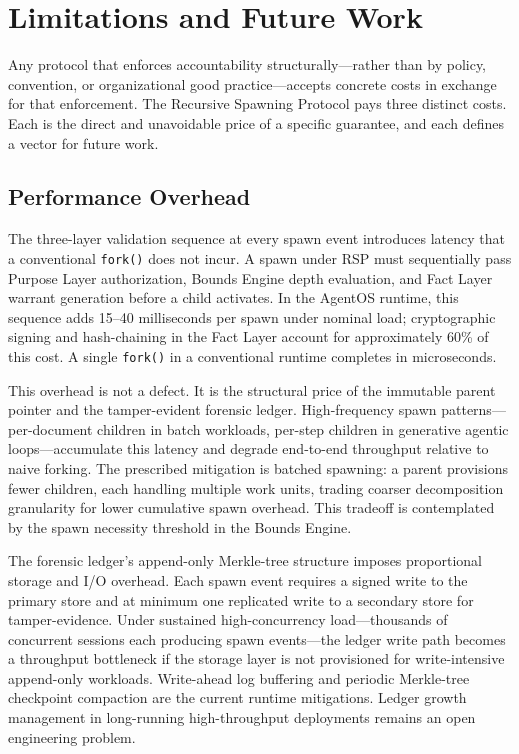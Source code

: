 \section{Limitations and Future Work}
\label{sec:rs-limitations}

Any protocol that enforces accountability structurally---rather than by policy, convention, or organizational good practice---accepts concrete costs in exchange for that enforcement. The Recursive Spawning Protocol pays three distinct costs. Each is the direct and unavoidable price of a specific guarantee, and each defines a vector for future work.

\subsection{Performance Overhead}
\label{sec:rs-perf-overhead}

The three-layer validation sequence at every spawn event introduces latency that a conventional \texttt{fork()} does not incur. A spawn under RSP must sequentially pass Purpose Layer authorization, Bounds Engine depth evaluation, and Fact Layer warrant generation before a child activates. In the AgentOS runtime, this sequence adds \numrange{15}{40} milliseconds per spawn under nominal load; cryptographic signing and hash-chaining in the Fact Layer account for approximately 60\% of this cost. A single \texttt{fork()} in a conventional runtime completes in microseconds.

This overhead is not a defect. It is the structural price of the immutable parent pointer and the tamper-evident forensic ledger. High-frequency spawn patterns---per-document children in batch workloads, per-step children in generative agentic loops---accumulate this latency and degrade end-to-end throughput relative to naive forking. The prescribed mitigation is batched spawning: a parent provisions fewer children, each handling multiple work units, trading coarser decomposition granularity for lower cumulative spawn overhead. This tradeoff is contemplated by the spawn necessity threshold in the Bounds Engine.

The forensic ledger's append-only Merkle-tree structure imposes proportional storage and I/O overhead. Each spawn event requires a signed write to the primary store and at minimum one replicated write to a secondary store for tamper-evidence. Under sustained high-concurrency load---thousands of concurrent sessions each producing spawn events---the ledger write path becomes a throughput bottleneck if the storage layer is not provisioned for write-intensive append-only workloads. Write-ahead log buffering and periodic Merkle-tree checkpoint compaction are the current runtime mitigations. Ledger growth management in long-running high-throughput deployments remains an open engineering problem.

